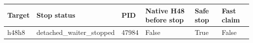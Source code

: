 {\small
\begin{tabular}{llllll}
\hline
Target & Stop status & PID & Native H48 before stop & Safe stop & Fast claim \\
\hline
h48h8 & detached\_waiter\_stopped & 47984 & False & True & False \\
\hline
\end{tabular}
}
